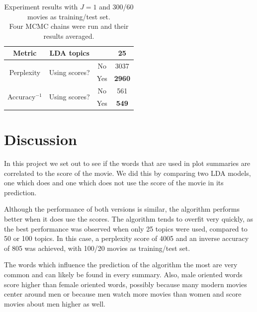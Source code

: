 \documentclass{article} %
\begin{document}
\begin{table}[ht!]
\captionsetup{justification=centering}
\caption{Experiment results with $J=1$ and 300/60 movies as training/test set.\\Four MCMC chains were run and their results averaged.} 
\label{tab:best}
\begin{center}
\begin{tabular}{c|cc|c}

Metric &	LDA topics      & & 25 \\ \hline
\multirow{2}{*}{Perplexity} &	\multirow{2}{*}{Using scores?} & No  & 3037 \\
			  &             & Yes & \textbf{2960} \\ \hline
\multirow{2}{*}{Accuracy$^{-1}$} & \multirow{2}{*}{Using scores?} & No  & 561 \\
			      &          & Yes & \textbf{549} \\
\end{tabular}
\end{center}
\end{table}

\section{Discussion}
\label{sec:discussion}

In this project we set out to see if the words that are used in plot summaries are correlated to the score of the movie. 
We did this by comparing two LDA models, one which does and one which does not use the score of the movie in its prediction.

Although the performance of both versions is similar, the algorithm performs better when it does use the scores.
The algorithm tends to overfit very quickly, as the best performance was observed when only 25 topics were used, compared to 50 or 100 topics.
In this case, a perplexity score of 4005 and an inverse accuracy of 805 was achieved, with 100/20 movies as training/test set.

The words which influence the prediction of the algorithm the most are very common and can likely be found in every summary. 
Also, male oriented words score higher than female oriented words, possibly because many modern movies center around men or because men watch more movies than women and score movies about men higher as well.
\end{document}
